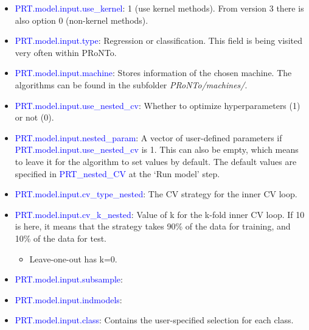 \begin{itemize}
 
\item \textcolor{blue}{PRT.model.input.use\_kernel}: 1 (use kernel methods). From version 3 there is also option 0 (non-kernel methods).

\item \textcolor{blue}{PRT.model.input.type}: Regression or classification. This field is being visited very often within PRoNTo.

\item \textcolor{blue}{PRT.model.input.machine}: Stores information of the chosen machine. The algorithms can be found in the subfolder \textit{PRoNTo/machines/}.

\item \textcolor{blue}{PRT.model.input.use\_nested\_cv}: Whether to optimize hyperparameters (1) or not (0).

\item \textcolor{blue}{PRT.model.input.nested\_param}: A vector of user-defined parameters if \textcolor{blue}{PRT.model.input.use\_nested\_cv} is 1. This can also be empty, which means to leave it for the algorithm to set values by default. The default values are specified in \textcolor{blue}{PRT\_nested\_CV} at the `Run model' step.

\item \textcolor{blue}{PRT.model.input.cv\_type\_nested}: The CV strategy for the inner CV loop.

\item \textcolor{blue}{PRT.model.input.cv\_k\_nested}: Value of k for the k-fold inner CV loop. If 10 is here, it means that the strategy takes 90\% of the data for training, and 10\% of the data for test.
\begin{itemize}
\item Leave-one-out has k=0.
\end{itemize}

\item \textcolor{blue}{PRT.model.input.subsample}: 

\item \textcolor{blue}{PRT.model.input.indmodels}:

\item \textcolor{blue}{PRT.model.input.class}: Contains the user-specified selection for each class. 


\end{itemize}
